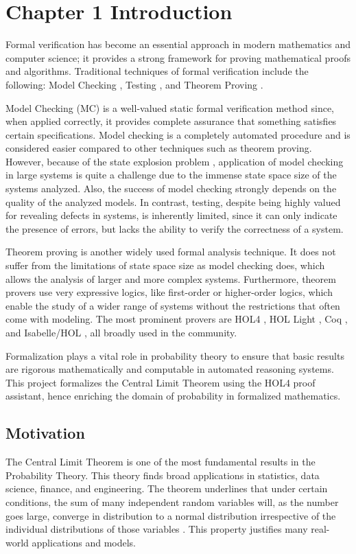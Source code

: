 \chapter[Introduction]{Chapter 1 Introduction}
\label{chap:1}

Formal verification has become an essential approach in modern mathematics and computer science; it provides a strong framework for proving mathematical proofs and algorithms. Traditional techniques of formal verification include the following: Model Checking \cite{clarke2018handbook}, Testing \cite{broy2005model}, and Theorem Proving \cite{bertot2013interactive}.

Model Checking (MC) is a well-valued static formal verification method since, when applied correctly, it provides complete assurance that something satisfies certain specifications. Model checking is a completely automated procedure and is considered easier compared to other techniques such as theorem proving. However, because of the state explosion problem \cite{burch1992symbolic}, application of model checking in large systems is quite a challenge due to the immense state space size of the systems analyzed. Also, the success of model checking strongly depends on the quality of the analyzed models. In contrast, testing, despite being highly valued for revealing defects in systems, is inherently limited, since it can only indicate the presence of errors, but lacks the ability to verify the correctness of a system.

Theorem proving is another widely used formal analysis technique. It does not suffer from the limitations of state space size as model checking does, which allows the analysis of larger and more complex systems. Furthermore, theorem provers use very expressive logics, like first-order or higher-order logics, which enable the study of a wider range of systems without the restrictions that often come with modeling. The most prominent provers are HOL4 \cite{slind2008brief}, HOL Light \cite{hol_light}, Coq \cite{bertot2013interactive}, and Isabelle/HOL \cite{isabelle_hol}, all broadly used in the community.

Formalization plays a vital role in probability theory to ensure that basic results are rigorous mathematically and computable in automated reasoning systems. This project formalizes the Central Limit Theorem using the HOL4 proof assistant, hence enriching the domain of probability in formalized mathematics.

\section{Motivation}
The Central Limit Theorem is one of the most fundamental results in the Probability Theory. This theory finds broad applications in statistics, data science, finance, and engineering. The theorem underlines that under certain conditions, the sum of many independent random variables will, as the number goes large, converge in distribution to a normal distribution irrespective of the individual distributions of those variables \cite{chung2000course}. This property justifies many real-world applications and models.

